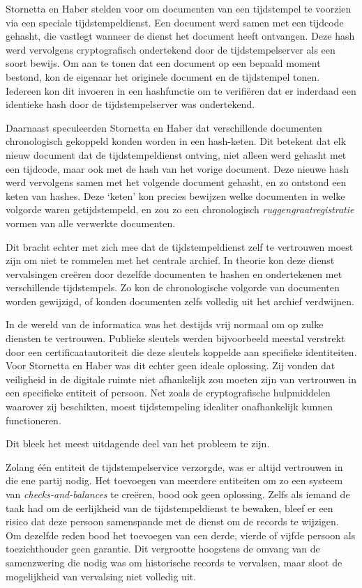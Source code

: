\documentclass[
  a5paper,
  smalldemyvopaper,11pt,twoside,onecolumn,openright,extrafontsizes,
hidelinks]{memoir}
\begin{document}
Stornetta en Haber stelden voor om documenten van een tijdstempel te
voorzien via een speciale tijdstempeldienst. Een document werd samen met
een tijdcode gehasht, die vastlegt wanneer de dienst het document heeft
ontvangen. Deze hash werd vervolgens cryptografisch ondertekend door de
tijdstempelserver als een soort bewijs. Om aan te tonen dat een document
op een bepaald moment bestond, kon de eigenaar het originele document en
de tijdstempel tonen. Iedereen kon dit invoeren in een hashfunctie om te
verifiëren dat er inderdaad een identieke hash door de tijdstempelserver
was ondertekend.

Daarnaast speculeerden Stornetta en Haber dat verschillende documenten
chronologisch gekoppeld konden worden in een hash-keten. Dit betekent
dat elk nieuw document dat de tijdstempeldienst ontving, niet alleen
werd gehasht met een tijdcode, maar ook met de hash van het vorige
document. Deze nieuwe hash werd vervolgens samen met het volgende
document gehasht, en zo ontstond een keten van hashes. Deze `keten' kon
precies bewijzen welke documenten in welke volgorde waren
getijdstempeld, en zou zo een chronologisch
\emph{ruggengraatregistratie} vormen van alle verwerkte documenten.

Dit bracht echter met zich mee dat de tijdstempeldienst zelf te
vertrouwen moest zijn om niet te rommelen met het centrale archief. In
theorie kon deze dienst vervalsingen creëren door dezelfde documenten te
hashen en ondertekenen met verschillende tijdstempels. Zo kon de
chronologische volgorde van documenten worden gewijzigd, of konden
documenten zelfs volledig uit het archief verdwijnen.

In de wereld van de informatica was het destijds vrij normaal om op
zulke diensten te vertrouwen. Publieke sleutels werden bijvoorbeeld
meestal verstrekt door een certificaatautoriteit die deze sleutels
koppelde aan specifieke identiteiten. Voor Stornetta en Haber was dit
echter geen ideale oplossing. Zij vonden dat veiligheid in de digitale
ruimte niet afhankelijk zou moeten zijn van vertrouwen in een specifieke
entiteit of persoon. Net zoals de cryptografische hulpmiddelen waarover
zij beschikten, moest tijdstempeling idealiter onafhankelijk kunnen
functioneren.

Dit bleek het meest uitdagende deel van het probleem te zijn.

Zolang één entiteit de tijdstempelservice verzorgde, was er altijd
vertrouwen in die ene partij nodig. Het toevoegen van meerdere
entiteiten om zo een systeem van \emph{checks-and-balances} te creëren,
bood ook geen oplossing. Zelfs als iemand de taak had om de eerlijkheid
van de tijdstempeldienst te bewaken, bleef er een risico dat deze
persoon samenspande met de dienst om de records te wijzigen. Om dezelfde
reden bood het toevoegen van een derde, vierde of vijfde persoon als
toezichthouder geen garantie. Dit vergrootte hoogstens de omvang van de
samenzwering die nodig was om historische records te vervalsen, maar
sloot de mogelijkheid van vervalsing niet volledig uit.
\end{document}
